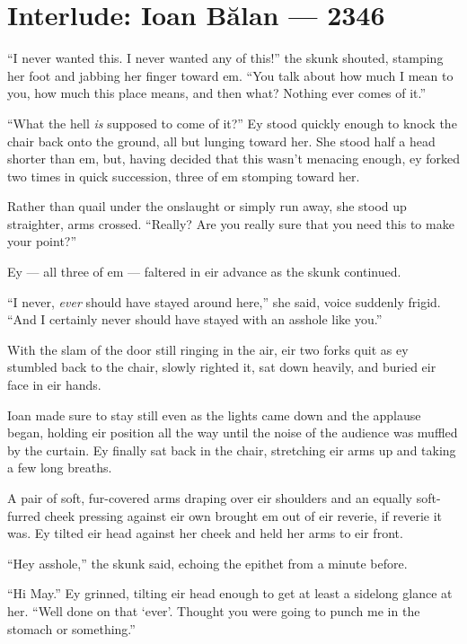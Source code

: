 \hypertarget{interlude-ioan-bux103lan-2346}{%
\chapter{Interlude: Ioan Bălan — 2346}\label{interlude-ioan-bux103lan-2346}}

``I never wanted this. I never wanted any of this!'' the skunk shouted, stamping her foot and jabbing her finger toward em. ``You talk about how much I mean to you, how much this place means, and then what? Nothing ever comes of it.''

``What the hell \emph{is} supposed to come of it?'' Ey stood quickly enough to knock the chair back onto the ground, all but lunging toward her. She stood half a head shorter than em, but, having decided that this wasn't menacing enough, ey forked two times in quick succession, three of em stomping toward her.

Rather than quail under the onslaught or simply run away, she stood up straighter, arms crossed. ``Really? Are you really sure that you need this to make your point?''

Ey — all three of em — faltered in eir advance as the skunk continued.

``I never, \emph{ever} should have stayed around here,'' she said, voice suddenly frigid. ``And I certainly never should have stayed with an asshole like you.''

With the slam of the door still ringing in the air, eir two forks quit as ey stumbled back to the chair, slowly righted it, sat down heavily, and buried eir face in eir hands.

Ioan made sure to stay still even as the lights came down and the applause began, holding eir position all the way until the noise of the audience was muffled by the curtain. Ey finally sat back in the chair, stretching eir arms up and taking a few long breaths.

A pair of soft, fur-covered arms draping over eir shoulders and an equally soft-furred cheek pressing against eir own brought em out of eir reverie, if reverie it was. Ey tilted eir head against her cheek and held her arms to eir front.

``Hey asshole,'' the skunk said, echoing the epithet from a minute before.

``Hi May.'' Ey grinned, tilting eir head enough to get at least a sidelong glance at her. ``Well done on that `ever'. Thought you were going to punch me in the stomach or something.''

